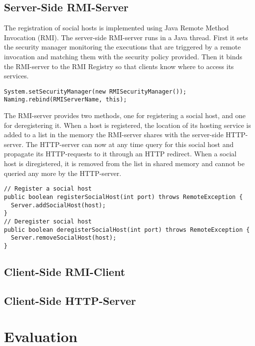 \documentclass[a4paper, 10pt]{article}
\begin{document}
\subsection{Server-Side RMI-Server}
The registration of social hosts is implemented using Java Remote Method Invocation (RMI). The server-side RMI-server runs in a Java thread. First it sets the security manager monitoring the executions that are triggered by a remote invocation and matching them with the security policy provided. Then it binds the RMI-server to the RMI Registry so that clients know where to access its services.
\begin{lstlisting}
System.setSecurityManager(new RMISecurityManager());
Naming.rebind(RMIServerName, this);
\end{lstlisting}
The RMI-server provides two methods, one for registering a social host, and one for deregistering it. When a host is registered, the location of its hosting service is added to a list in the memory the RMI-server shares with the server-side HTTP-server. The HTTP-server can now at any time query for this social host and propagate its HTTP-requests to it through an HTTP redirect. When a social host is diregistered, it is removed from the list in shared memory and cannot be queried any more by the HTTP-server.
\begin{lstlisting}
// Register a social host
public boolean registerSocialHost(int port) throws RemoteException {
  Server.addSocialHost(host);
}
// Deregister social host
public boolean deregisterSocialHost(int port) throws RemoteException {
  Server.removeSocialHost(host);
}

\end{lstlisting}
\subsection{Client-Side RMI-Client}

\subsection{Client-Side HTTP-Server}

\section{Evaluation}




\begin{lstlisting}
\end{lstlisting}
\end{document}
